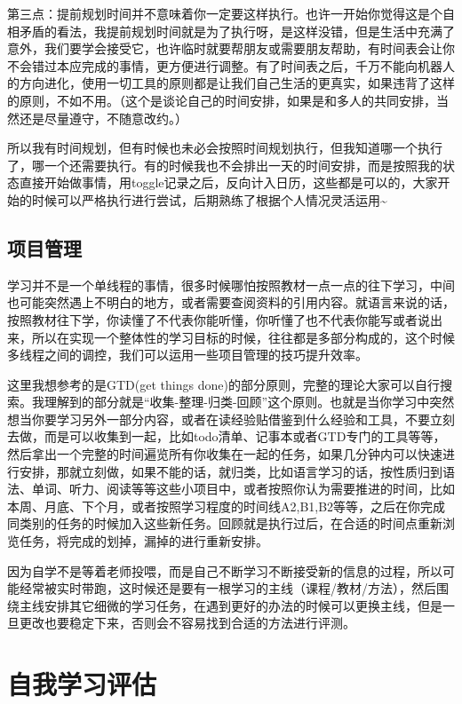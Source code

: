 \documentclass[
]{book}
\begin{document}
第三点：提前规划时间并不意味着你一定要这样执行。也许一开始你觉得这是个自相矛盾的看法，我提前规划时间就是为了执行呀，是这样没错，但是生活中充满了意外，我们要学会接受它，也许临时就要帮朋友或需要朋友帮助，有时间表会让你不会错过本应完成的事情，更方便进行调整。有了时间表之后，千万不能向机器人的方向进化，使用一切工具的原则都是让我们自己生活的更真实，如果违背了这样的原则，不如不用。（这个是谈论自己的时间安排，如果是和多人的共同安排，当然还是尽量遵守，不随意改约。）

所以我有时间规划，但有时候也未必会按照时间规划执行，但我知道哪一个执行了，哪一个还需要执行。有的时候我也不会排出一天的时间安排，而是按照我的状态直接开始做事情，用toggle记录之后，反向计入日历，这些都是可以的，大家开始的时候可以严格执行进行尝试，后期熟练了根据个人情况灵活运用\textasciitilde{}

\hypertarget{ux9879ux76eeux7ba1ux7406}{%
\section{项目管理}\label{ux9879ux76eeux7ba1ux7406}}

学习并不是一个单线程的事情，很多时候哪怕按照教材一点一点的往下学习，中间也可能突然遇上不明白的地方，或者需要查阅资料的引用内容。就语言来说的话，按照教材往下学，你读懂了不代表你能听懂，你听懂了也不代表你能写或者说出来，所以在实现一个整体性的学习目标的时候，往往都是多部分构成的，这个时候多线程之间的调控，我们可以运用一些项目管理的技巧提升效率。

这里我想参考的是GTD(get things done)的部分原则，完整的理论大家可以自行搜索。我理解到的部分就是``收集-整理-归类-回顾''这个原则。也就是当你学习中突然想当你要学习另外一部分内容，或者在读经验贴借鉴到什么经验和工具，不要立刻去做，而是可以收集到一起，比如todo清单、记事本或者GTD专门的工具等等，然后拿出一个完整的时间遍览所有你收集在一起的任务，如果几分钟内可以快速进行安排，那就立刻做，如果不能的话，就归类，比如语言学习的话，按性质归到语法、单词、听力、阅读等等这些小项目中，或者按照你认为需要推进的时间，比如本周、月底、下个月，或者按照学习程度的时间线A2,B1,B2等等，之后在你完成同类别的任务的时候加入这些新任务。回顾就是执行过后，在合适的时间点重新浏览任务，将完成的划掉，漏掉的进行重新安排。

因为自学不是等着老师投喂，而是自己不断学习不断接受新的信息的过程，所以可能经常被实时带跑，这时候还是要有一根学习的主线（课程/教材/方法），然后围绕主线安排其它细微的学习任务，在遇到更好的办法的时候可以更换主线，但是一旦更改也要稳定下来，否则会不容易找到合适的方法进行评测。

\hypertarget{ux81eaux6211ux5b66ux4e60ux8bc4ux4f30}{%
\chapter{自我学习评估}\label{ux81eaux6211ux5b66ux4e60ux8bc4ux4f30}}
\end{document}

